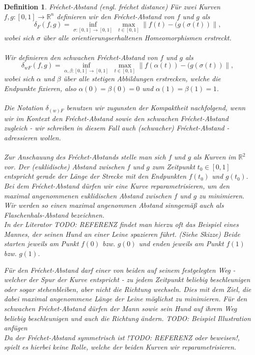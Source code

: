 \documentclass[a4paper, 12pt, twoside]{article}
\theoremstyle{Format1} %
\newtheorem{Def}{Definition}[section]       %
\begin{document}
\begin{Def}
	Fréchet-Abstand (engl. fréchet distance)
	Für zwei Kurven $ f, g: [0,1] \to \mathbb{R}^n $ definieren wir den \textit{Fréchet-Abstand} von $f$ und $g$ als
	$$ \delta_F(f,g) =  \inf_{\sigma:[0,1] \to [0,1]} \; \max_{t \in [0,1]} \lVert f(t)-(g(\sigma(t)) \rVert, $$
	wobei sich $\sigma $ über alle orientierungserhaltenen Homeomorphismen erstreckt.
	\\
	\\
	Wir definieren den \textit{schwachen Fréchet-Abstand} von $f$ und $g$ als
	$$\delta_{wF}(f,g) =\inf_{\alpha , \beta :[0,1] \to [0,1]} \; \max_{t \in [0,1]} \lVert f(\alpha(t))-(g(\sigma(t)) \rVert,$$
	wobei sich $\alpha$ und $\beta$ über alle stetigen Abbildungen erstrecken, welche die Endpunkte fixieren, also $\alpha(0) = \beta(0) = 0$
	und $\alpha(1) = \beta(1) = 1$.
	\\
	\\
	Die Notation $ \delta_{(w)F} $ benutzen wir zugunsten der Kompaktheit nachfolgend, wenn wir im Kontext den Fréchet-Abstand sowie den schwachen Fréchet-Abstand zugleich -
	wir schreiben in diesem Fall auch \textit{(schwacher) Fréchet-Abstand} - adressieren wollen.
	\\
	\\
	Zur Anschauung des Fréchet-Abstands stelle man sich $f$ und $g$ als Kurven im $\mathbb{R}^2$ vor. Der (euklidische) Abstand zwischen $f$ und $g$ zum Zeitpunkt $t_0 \in [0,1]$ entspricht gerade der Länge der Strecke
	mit den Endpunkten $f(t_0)$ und $g(t_0)$. Bei dem Fréchet-Abstand dürfen wir eine Kurve reparametrisieren, um den maximal angenommenen euklidischen Abstand zwischen $f$ und $g$ zu minimieren.
	Wir werden so einen maximal angenommen Abstand sinngemäß auch als \textit{Flaschenhals-Abstand} bezeichnen.\\

	In der Literator TODO: REFERENZ findet man hierzu oft das Beispiel eines Mannes, der seinen Hund an einer Leine spazieren führt. (Siehe Skizze)
	Beide starten jeweils am Punkt $f(0)$ bzw. $g(0)$ und enden jeweils am Punkt $f(1)$ bzw. $g(1)$.

	Für den Fréchet-Abstand darf einer von beiden auf seinem festgelegten Weg - welcher der Spur der Kurve entspricht - zu jedem Zeitpunkt beliebig beschleunigen oder sogar stehenbleiben, aber nicht die Richtung wechseln.
	Dies mit dem Ziel, die dabei maximal angenommene Länge der Leine möglichst zu minimieren.
	Für den schwachen Fréchet-Abstand dürfen der Mann sowie sein Hund auf ihrem Weg beliebig beschleunigen und auch die Richtung ändern.
	TODO: Beispiel Illustration anfügen
	\\
	Da der Fréchet-Abstand symmetrisch ist !TODO: REFERENZ oder beweisen!, spielt es hierbei keine Rolle, welche der beiden Kurven wir reparametrisieren.
\end{Def}
\end{document}
